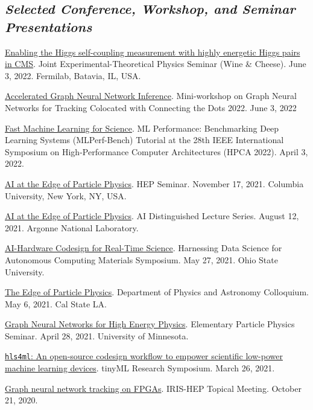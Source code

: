 \documentclass[11pt]{res}
\newcommand{\MarginText}[1]{\section{\textit{#1}}}
\begin{document}
\begin{resume}
  \MarginText{Selected Conference, Workshop, and Seminar Presentations}

  \href{https://theory.fnal.gov/events/event/tbd-137/}{Enabling the Higgs self-coupling measurement with highly energetic Higgs pairs in CMS}. Joint Experimental-Theoretical Physics Seminar (Wine \& Cheese). June 3, 2022. Fermilab, Batavia, IL, USA.

  \href{https://indico.cern.ch/event/1128328/contributions/4900731/}{Accelerated Graph Neural Network Inference}. Mini-workshop on Graph Neural Networks for Tracking Colocated with Connecting the Dots 2022. June 3, 2022

  \href{https://sites.google.com/g.harvard.edu/mlperf-bench-hpca22/home}{Fast Machine Learning for Science}. ML Performance: Benchmarking Deep Learning Systems (MLPerf-Bench) Tutorial at the 28th IEEE International Symposium on High-Performance Computer Architectures (HPCA 2022). April 3, 2022.

  \href{https://physics.columbia.edu/events/hep-seminar-dr-javier-duarte-ucsd}{AI at the Edge of Particle Physics}. HEP Seminar. November 17, 2021. Columbia University, New York, NY, USA.

  \href{https://www.anl.gov/event/ai-at-the-edge-of-particle-physics}{AI at the Edge of Particle Physics}. AI Distinguished Lecture Series. August 12, 2021. Argonne National Laboratory.

  \href{https://tdai.osu.edu/events/acm-symposium-harnessing-data-science-autonomous-computing-materials}{AI-Hardware Codesign for Real-Time Science}. Harnessing Data Science for Autonomous Computing Materials Symposium. May 27, 2021. Ohio State University.

  \href{https://www.calstatela.edu/dept/physics/colloquia-and-events}{The Edge of Particle Physics}. Department of Physics and Astronomy Colloquium. May 6, 2021. Cal State LA.

  \href{https://cse.umn.edu/physics/elementary-particle-physics-elem-part-phys-seminar}{Graph Neural Networks for High Energy Physics}. Elementary Particle Physics Seminar. April 28, 2021. University of Minnesota.

  \href{https://www.tinyml.org/event/research-symposium-2021/}{\texttt{hls4ml}: An open-source codesign workflow to empower scientific low-power machine learning devices}. tinyML Research Symposium. March 26, 2021.

  \href{https://indico.cern.ch/event/955026/}{Graph neural network tracking on FPGAs}. IRIS-HEP Topical Meeting. October 21, 2020.


\end{resume}
\end{document}
